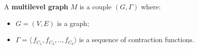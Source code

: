 \begin{minipage}[t]{\textwidth}
\begin{definizione}
    A \textbf{multilevel graph} $M$ is a couple $(G, \Gamma)$ where:
        \begin{itemize}
            \item $G = (V, E)$ is a graph;
            \item $\Gamma = \langle \, f_{C_1}, f_{C_2}, .., f_{C_k} \rangle$ is a sequence of contraction functions.
        \end{itemize}
    \end{definizione}
\end{minipage}